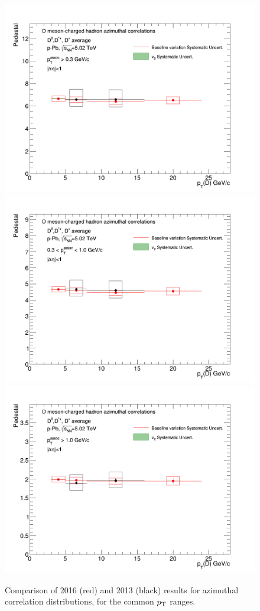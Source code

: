 \begin{figure}[!htbp]
{\includegraphics[width=0.31\linewidth]{figures/Cfr2013vs2016/Pedestal_Cfr_2013_2016_Thr03to99.png}}
{\includegraphics[width=0.31\linewidth]{figures/Cfr2013vs2016/Pedestal_Cfr_2013_2016_Thr03to1.png}}
{\includegraphics[width=0.31\linewidth]{figures/Cfr2013vs2016/Pedestal_Cfr_2013_2016_Thr1to99.png}}
\caption{Comparison of 2016 (red) and 2013 (black) results for azimuthal correlation distributions, for the common $p_{\rm T}$ ranges.}
\label{fig:CfrObs}
\end{figure} 